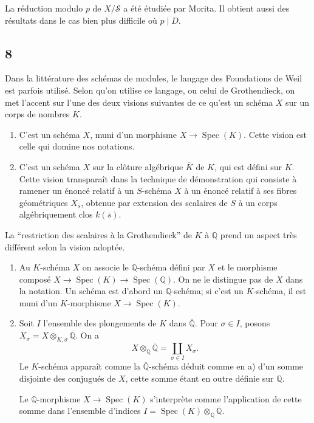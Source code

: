 \documentclass{amsart}
\theoremstyle{plain}
\theoremstyle{remark}
\DeclareMathOperator{\Spec}{Spec}
\newcommand{\bbQ}{\mathbb{Q}}
\begin{document}
La r\'eduction modulo $p$ de $X/\mathcal{S}$ a \'et\'e \'etudi\'ee par Morita. Il obtient aussi des r\'esultats dans le cas bien plus difficile o\`u $p \mid D$.

\subsection*{8}
Dans la litt\'erature des sch\'emas de modules, le langage des Foundations de Weil est parfois utilis\'e. Selon qu'on utilise ce langage, ou celui de Grothendieck, on met l'accent sur l'une des deux visions suivantes de ce qu'est un sch\'ema $X$ sur un corps de nombres $K$.

\begin{enumerate}
\item[a)] C'est un sch\'ema $X$, muni d'un morphisme $X \to \Spec(K)$. Cette vision est celle qui domine nos notations.
\item[b)] C'est un sch\'ema $X$ sur la cl\^oture alg\'ebrique $\overline{K}$ de $K$, qui est d\'efini sur $K$. Cette vision transpara\^it dans la technique de d\'emonstration qui consiste \`a ramener un \'enonc\'e relatif \`a un $S$-sch\'ema $X$ \`a un \'enonc\'e relatif \`a ses fibres g\'eom\'etriques $X_{\overline{s}}$, obtenue par extension des scalaires de $S$ \`a un corps alg\'ebriquement clos $k(\overline{s})$.
\end{enumerate}

La ``restriction des scalaires \`a la Grothendieck'' de $K$ \`a $\bbQ$ prend un aspect tr\`es diff\'erent selon la vision adopt\'ee.

\begin{enumerate}
\item[a)] Au $K$-sch\'ema $X$ on associe le $\bbQ$-sch\'ema d\'efini par $X$ et le morphisme compos\'e $X \to \Spec(K) \to \Spec(\bbQ)$. On ne le distingue pas de $X$ dans la notation. Un sch\'ema est d'abord un $\bbQ$-sch\'ema; si c'est un $K$-sch\'ema, il est muni d'un $K$-morphisme $X \to \Spec(K)$.
\item[b)] Soit $I$ l'ensemble des plongements de $K$ dans $\overline{\bbQ}$. Pour $\sigma \in I$, posons $X_\sigma = X \otimes_{K,\sigma} \overline{\bbQ}$. On a
\[
X \otimes_{\bbQ} \overline{\bbQ} = \coprod_{\sigma \in I} X_\sigma.
\]
Le $K$-sch\'ema appara\^it comme la $\overline{\bbQ}$-sch\'ema d\'eduit comme en a) d'un somme disjointe des conjugu\'es de $X$, cette somme \'etant en outre d\'efinie sur $\bbQ$.

Le $\bbQ$-morphisme $X \to \Spec(K)$ s'interpr\`ete comme l'application de cette somme dans l'ensemble d'indices $I = \Spec(K) \otimes_{\bbQ} \overline{\bbQ}$.
\end{enumerate}
\end{document}
